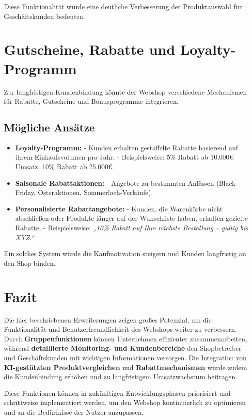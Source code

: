 \documentclass[%
	12pt,
	a4paper,
	oneside,
	parskip=full
]{scrbook}
\begin{document}
Diese Funktionalität würde eine deutliche Verbesserung der Produktauswahl für Geschäftskunden bedeuten.

\section{Gutscheine, Rabatte und Loyalty-Programm}

Zur langfristigen Kundenbindung könnte der Webshop verschiedene Mechanismen für Rabatte, Gutscheine und Bonusprogramme integrieren.

\subsection{Mögliche Ansätze}
\begin{itemize}
	\item \textbf{Loyalty-Programm:}  
	- Kunden erhalten gestaffelte Rabatte basierend auf ihrem Einkaufsvolumen pro Jahr.
	- Beispielsweise: 5\% Rabatt ab 10.000€ Umsatz, 10\% Rabatt ab 25.000€.
	\item \textbf{Saisonale Rabattaktionen:}  
	- Angebote zu bestimmten Anlässen (Black Friday, Osteraktionen, Sommerloch-Verkäufe).
	\item \textbf{Personalisierte Rabattangebote:}  
	- Kunden, die Warenkörbe nicht abschließen oder Produkte länger auf der Wunschliste haben, erhalten gezielte Rabatte.  
	- Beispielsweise: \textit{„10\% Rabatt auf Ihre nächste Bestellung – gültig bis XYZ.“}
\end{itemize}

Ein solches System würde die Kaufmotivation steigern und Kunden langfristig an den Shop binden.

\section{Fazit}

Die hier beschriebenen Erweiterungen zeigen großes Potenzial, um die Funktionalität und Benutzerfreundlichkeit des Webshops weiter zu verbessern. Durch \textbf{Gruppenfunktionen} können Unternehmen effizienter zusammenarbeiten, während \textbf{detaillierte Monitoring- und Kundenbereiche} den Shopbetreiber und Geschäftskunden mit wichtigen Informationen versorgen. Die Integration von \textbf{KI-gestützten Produktvergleichen} und \textbf{Rabattmechanismen} würde zudem die Kundenbindung erhöhen und zu langfristigem Umsatzwachstum beitragen.

Diese Funktionen können in zukünftigen Entwicklungsphasen priorisiert und schrittweise implementiert werden, um den Webshop kontinuierlich zu optimieren und an die Bedürfnisse der Nutzer anzupassen.
\end{document}
